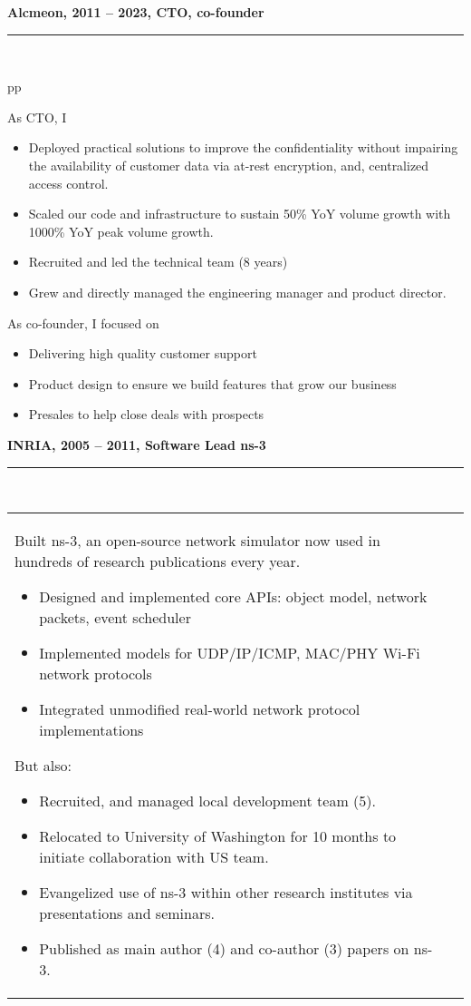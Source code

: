 \documentclass[a4paper,12pt]{article}
\newcommand{\ligne}[1]{\rule[0.5ex]{\textwidth}{#1}\\}
\newcommand{\styleRub}[1]{\textbf{\large #1}\par}
\newcommand{\indentStd}{\noindent\hspace*{10pt}}
\newenvironment{rubrique}[2][\linewidth]%
{\styleRub{#2}%
\ligne{0.5mm}
\setlength{\lenB}{#1}%
\setlength{\lenC}{\linewidth}%
\addtolength{\lenC}{-\lenA}%
\addtolength{\lenC}{-\lenB}%
\addtolength{\lenC}{-19pt}
\indentStd\begin{tabular}[t]{p{\lenB}p{\lenC}}}
{\end{tabular}}
\newlength{\lenA} %
\newlength{\lenB} %
\newlength{\lenC} %
\begin{document}
\begin{rubrique}{Alcmeon, 2011 -- 2023, CTO, co-founder}

As CTO, I 
\begin{itemize}
\item Deployed practical solutions to improve the confidentiality 
        without impairing the availability of customer data via 
        at-rest encryption, and, centralized access control.
\item Scaled our code and infrastructure to sustain
        50\% YoY volume growth with 1000\% YoY peak volume growth.
\item Recruited and led the technical team (8 years)
\item Grew and directly managed the engineering manager and product
        director.
\end{itemize}


As co-founder, I focused on
\begin{itemize}
\item Delivering high quality customer support
\item Product design to ensure we build features that grow our business
\item Presales to help close deals with prospects
\end{itemize}

\end{rubrique}

\pagebreak

\begin{rubrique}{INRIA, 2005 -- 2011, Software Lead ns-3}
  Built ns-3, an open-source network simulator now used in hundreds of research publications every year. 
 
  \begin{itemize}
  \item Designed and implemented core APIs: object model, network packets, event scheduler
  \item Implemented models for UDP/IP/ICMP, MAC/PHY Wi-Fi network protocols
  \item Integrated unmodified real-world network protocol implementations
  \end{itemize}

  But also:
  \begin{itemize}
  \item Recruited, and managed local development team (5).
  \item Relocated to University of Washington for 10 months to initiate collaboration with US team.
  \item Evangelized use of ns-3 within other research institutes via
    presentations and seminars.
  \item Published as main author (4) and co-author (3) papers on ns-3.
  \end{itemize}

\end{rubrique}
\end{document}

